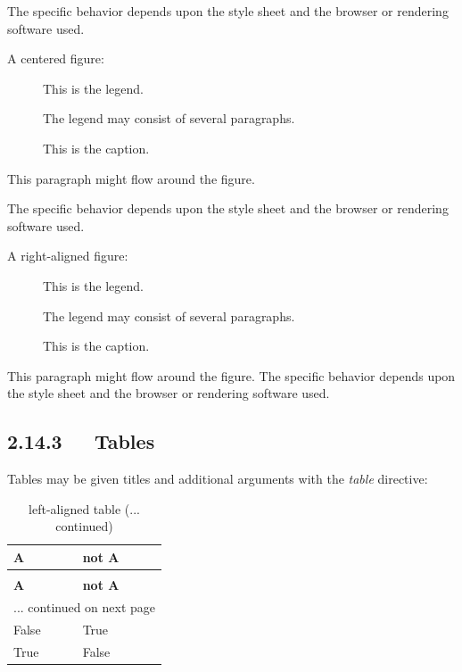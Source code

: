\documentclass[a4paper]{memoir}
\newlength{\DUtablewidth} %
\newenvironment{DUlegend}{\small}{}
\begin{document}
The specific behavior depends upon the style sheet and the browser or
rendering software used.

A centered figure:

\begin{figure}
\noindent{}
\caption{This is the caption.}
\begin{DUlegend}
This is the legend.

The legend may consist of several paragraphs.
\end{DUlegend}
\end{figure}

This paragraph might flow around the figure.

The specific behavior depends upon the style sheet and the browser or
rendering software used.

A right-aligned figure:

\begin{figure} %
\noindent{}
\caption{This is the caption.}
\begin{DUlegend}
This is the legend.

The legend may consist of several paragraphs.
\end{DUlegend}
\end{figure}

This paragraph might flow around the figure. The specific behavior depends
upon the style sheet and the browser or rendering software used.


\subsection{2.14.3   Tables%
  \label{tables}%
}

Tables may be given titles and additional arguments with the \emph{table}
directive:

\setlength{\DUtablewidth}{\linewidth}%
\begin{longtable}[l]{|p{0.075\DUtablewidth}|p{0.075\DUtablewidth}|}
\caption{left-aligned table}\\
\hline
\textbf{%
A
} & \textbf{%
not A
} \\
\hline
\endfirsthead
\caption[]{left-aligned table (... continued)}\\
\hline
\textbf{%
A
} & \textbf{%
not A
} \\
\hline
\endhead
\multicolumn{2}{c}{\hfill ... continued on next page} \\
\endfoot
\endlastfoot

False
 & 
True
 \\
\hline

True
 & 
False
 \\
\hline
\end{longtable}
\end{document}
